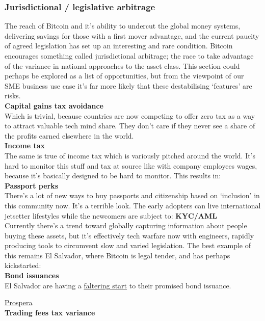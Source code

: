 \subsubsection{Jurisdictional / legislative  arbitrage}
The reach of Bitcoin and it's ability to undercut the global money systems, delivering savings for those with a first mover advantage, and the current paucity of agreed legislation has set up an interesting and rare condition. Bitcoin encourages something called jurisdictional arbitrage; the race to take advantage of the variance in national approaches to the asset class. This section could perhaps be explored as a list of opportunities, but from the viewpoint of our SME business use case it's far more likely that these destabilising `features' are risks.\\
\textbf{Capital gains tax avoidance}\\
Which is trivial, because countries are now competing to offer zero tax as a way to attract valuable tech mind share. They don't care if they never see a share of the profits earned elsewhere in the world.\\
\textbf{Income tax}\\
The same is true of income tax which is variously pitched around the world. It's hard to monitor this stuff and tax at source like with company employees wages, because it's basically designed to be hard to monitor. This results in:\\
\textbf{Passport perks}\\
There's a lot of new ways to buy passports and citizenship based on `inclusion' in this community now. It's a terrible look. The early adopters can live international jetsetter lifestyles while the newcomers are subject to:
\textbf{KYC/AML}\\
Currently there's a trend toward globally capturing information about people buying these assets, but it's effectively tech warfare now with engineers, rapidly producing tools to circumvent slow and varied legislation. The best example of this remains El Salvador, where Bitcoin is legal tender, and has perhaps kickstarted:\\
\textbf{Bond issuances}\\
El Salvador are having a \href{https://www.ft.com/content/4fa63c8c-51f5-4512-b522-76dd75e62916}{faltering start} to their promised bond issuance.\par
\href{https://prospera.hn/news/press-releases/pr\%C3\%B3spera-announces-bitcoin-bond-authority-in-the-first-crypto-friendly-jurisdiction-that-is-fully-aml-kyc-compliant}{Prospera}\\
\textbf{Trading fees tax variance}\\


